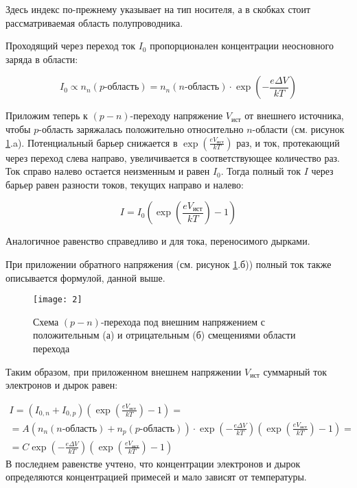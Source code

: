 \documentclass[a4paper, 12pt]{article}
\begin{document}
	Здесь индекс по-прежнему указывает на тип носителя, а в скобках стоит рассматриваемая область полупроводника.
	
	Проходящий через переход ток $I_0$ пропорционален концентрации неосновного заряда в области: 
	
	\[ I_0 \propto n_n(p\text{-область}) = n_n(n\text{-область}) \cdot \exp{\left(-\frac{e\Delta V}{kT}\right)} \]
	
	Приложим теперь к $(p-n)$-переходу напряжение $V_\text{ист}$ от внешнего источника, чтобы $p$-область заряжалась положительно относительно $n$-области (см. рисунок \ref{pic:external_voltage}.a). Потенциальный барьер снижается в $\exp{\left(\frac{eV_\text{ист}}{kT}\right)}$ раз, и ток, протекающий через переход слева направо, увеличивается в соответствующее количество раз. Ток справо налево остается неизменным и равен $I_0$. Тогда полный ток $I$ через барьер равен разности токов, текущих направо и налево: 
	
	\[ I = I_0\left(\exp\left(\frac{eV_\text{ист}}{kT}\right) - 1\right) \]
	
	Аналогичное равенство справедливо и для тока, переносимого дырками. 
	
	При приложении обратного напряжения (см. рисунок \ref{pic:external_voltage}.б)) полный ток также описывается формулой, данной выше.
	
	\begin{figure}[h]
		\centering	
		\texttt{[image: 2]}
		\caption{Схема $(p-n)$-перехода под внешним напряжением с положительным (а) и отрицательным (б) смещениями области перехода}
		\label{pic:external_voltage}
	\end{figure} 
	
	Таким образом, при приложенном внешнем напряжении $V_\text{ист}$ суммарный ток электронов и дырок равен: 

        \begin{multline}
	 I = (I_{0, n} + I_{0, p})
         \left(\exp\left(\frac{eV_\text{ист}}{kT}\right) - 1\right) =
         \\= A(n_n(n\text{-область}) + n_p(p\text{-область})) \cdot
         \exp\left(-\frac{e\Delta
         V}{kT}\right)\left(\exp{\left(\frac{eV_\text{ист}}{kT}\right)}
     - 1\right) =\\ 
	 = C \exp\left(-\frac{e\Delta V}{kT}\right)\left(\exp{\left(\frac{eV_\text{ист}}{kT}\right)} - 1\right) 
    \end{multline}
	В последнем равенстве учтено, что концентрации электронов и дырок определяются концентрацией примесей и мало зависят от температуры. 
	
\end{document}
